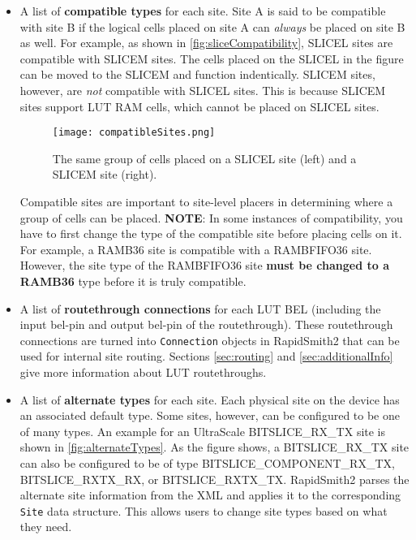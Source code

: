 \begin{itemize}
  \item A list of \textbf{compatible types} for each site. Site A is said to be
  compatible with site B if the logical cells placed on site A can
  \textit{always} be placed on site B as well. For example, as shown in
  \autoref{fig:sliceCompatibility}, SLICEL sites are compatible with SLICEM
  sites. The cells placed on the SLICEL in the figure can be moved to the
  SLICEM and function indentically. SLICEM sites, however, are \textit{not}
  compatible with SLICEL sites. This is because SLICEM sites support LUT RAM
  cells, which cannot be placed on SLICEL sites.
  
  \begin{figure}[H]
    \centering
    \texttt{[image: compatibleSites.png]}
    \caption{The same group of cells placed on a SLICEL site (left) and a SLICEM
    site (right).}
    \label{fig:sliceCompatibility}
  \end{figure}
  
  \noindent Compatible sites are important
  to site-level placers in determining where a group of cells can be placed.
  \textbf{NOTE}: In some instances of compatibility, you have to first change
  the type of the compatible site before placing cells on it. For example, a
  RAMB36 site is compatible with a RAMBFIFO36 site. However, the site type of
  the RAMBFIFO36 site \textbf{must be changed to a RAMB36} type before it is
  truly compatible.
  
  \item A list of \textbf{routethrough connections} for each LUT BEL (including
  the input bel-pin and output bel-pin of the routethrough). These routethrough
  connections are turned into \texttt{Connection} objects in RapidSmith2 that
  can be used for internal site routing. Sections \ref{sec:routing} and
  \ref{sec:additionalInfo} give more information about LUT routethroughs.
  
  \item A list of \textbf{alternate types} for each site. Each physical site on
  the device has an associated default type. Some sites, however, can be
  configured to be one of many types. An example for an UltraScale
  BITSLICE\_RX\_TX site is shown in \autoref{fig:alternateTypes}. As the figure
  shows, a BITSLICE\_RX\_TX site can also be configured to be of type
  BITSLICE\_COMPONENT\_RX\_TX, BITSLICE\_RXTX\_RX, or BITSLICE\_RXTX\_TX.
  RapidSmith2 parses the alternate site information from the XML and applies it
  to the corresponding \texttt{Site} data structure. This allows users to change
  site types based on what they need.
  

\end{itemize}
